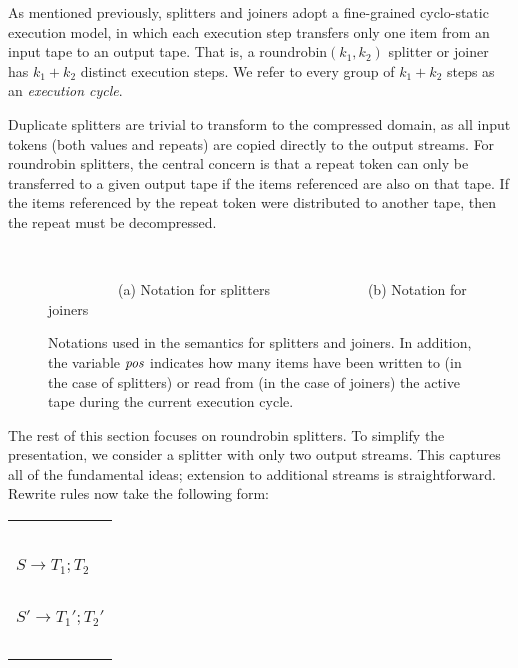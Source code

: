 As mentioned previously, splitters and joiners adopt a fine-grained
cyclo-static execution model, in which each execution step transfers
only one item from an input tape to an output tape.  That is, a
roundrobin$(k_1, k_2)$ splitter or joiner has $k_1 + k_2$ distinct
execution steps.  We refer to every group of $k_1 + k_2$ steps as an
{\it execution cycle}.

Duplicate splitters are trivial to transform to the compressed domain,
as all input tokens (both values and repeats) are copied directly to
the output streams.  For roundrobin splitters, the central concern is
that a repeat token can only be transferred to a given output tape if
the items referenced are also on that tape.  If the items referenced
by the repeat token were distributed to another tape, then the repeat
must be decompressed.

\begin{figure}[t]
\vspace{-1pt} %
~~~~~~~~~

\mbox{~~~~~~~~~~}(a) Notation for splitters~~~~~~~~~~~~~~(b) Notation for joiners
\caption{Notations used in the semantics for splitters and joiners.
  In addition, the variable $\mbox{\it pos}$ indicates how many items have been
  written to (in the case of splitters) or read from (in the case of
  joiners) the active tape during the current execution cycle.
  \protect\label{fig:sj-pic}}
\end{figure}

The rest of this section focuses on roundrobin splitters.  To simplify
the presentation, we consider a splitter with only two output streams.
This captures all of the fundamental ideas; extension to additional
streams is straightforward.  Rewrite rules now take the following
form:

\hspace{-12pt}\begin{tabular}{l} ~ \vspace{-6pt} \\ 
\hspace{-3pt}$S \rightarrow T_1; T_2$ \hspace{-7pt}~\vspace{0.5pt} \\ \hline ~ \vspace{-7.5pt} \\
\hspace{-3pt}$S' \rightarrow T_1'; T_2'$ \hspace{-7pt} \\ ~ \vspace{-6pt} \\
\end{tabular}

